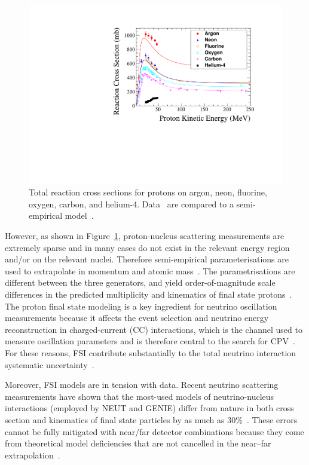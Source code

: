 \begin{figure}%
    \centering
    \includegraphics[width=12cm]{files/Figures/DataProtonCrossSections.pdf}%
    \caption{Total reaction cross sections for protons on argon, neon, fluorine, oxygen, carbon, and helium-4. Data~\cite{Carlson:1996ofz} are compared to a semi-empirical model~\cite{wellisch1996total}.}
    \label{fig:DataProtonXSec}%
\end{figure}

However, as shown in Figure~\ref{fig:DataProtonXSec}, proton-nucleus scattering measurements are extremely sparse and in many cases do not exist in the relevant energy region and/or on the relevant nuclei.
Therefore semi-empirical parameterisations are used to extrapolate in momentum and atomic mass~\cite{wellisch1996total}.  
The parametrisations are different between the three generators, and yield order-of-magnitude scale differences in the predicted multiplicity and kinematics of final state protons~\cite{dune2018high}.
The proton final state modeling is a key ingredient for neutrino oscillation measurements because it affects the event selection and neutrino energy reconstruction in charged-current (CC) interactions, which is the channel used to measure oscillation parameters and is therefore central to the search for CPV~\cite{Abe:2013hdq}.
For these reasons, FSI contribute substantially to the total neutrino interaction systematic uncertainty~\cite{Abe:2019vii}. 

Moreover, FSI models are in tension with data.  
Recent neutrino scattering measurements have shown that the most-used models of neutrino-nucleus interactions (employed by NEUT and GENIE) differ from nature in both cross section and kinematics of final state particles by as much as 30\%~\cite{McFarland:2018aaa}. 
These errors cannot be fully mitigated with near/far detector combinations because they come from theoretical model deficiencies that are not cancelled in the near–far extrapolation~\cite{Coloma:2013rqa}. 

